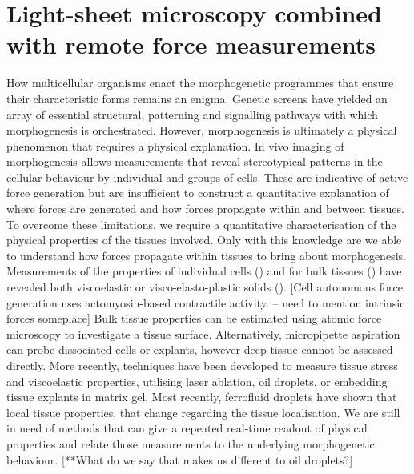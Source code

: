 \ifpdf
    \graphicspath{{Chapter3/Figs/Raster/}{Chapter3/Figs/PDF/}{Chapter3/Figs/}}
\else
    \graphicspath{{Chapter3/Figs/Vector/}{Chapter3/Figs/}}
\fi

\chapter[Light-sheet microscopy combined with remote force measurements]{Light-sheet microscopy combined with remote force measurements}%

How multicellular organisms enact the morphogenetic programmes that ensure their characteristic forms remains an enigma. Genetic screens have yielded an array of essential structural, patterning and signalling pathways with which morphogenesis is orchestrated.
However, morphogenesis is ultimately a physical phenomenon that requires a physical explanation.  In vivo imaging of morphogenesis allows measurements that reveal stereotypical patterns in the cellular behaviour by individual and groups of cells.
These are indicative of active force generation but are insufficient to construct a quantitative explanation of where forces are generated and how forces propagate within and between tissues. To overcome these limitations, we require a quantitative characterisation of the physical properties of the tissues involved.
Only with this knowledge are we able to understand how forces propagate within tissues to bring about morphogenesis. Measurements of the properties of individual cells () and for bulk tissues () have revealed both viscoelastic or visco-elasto-plastic solids ().
[Cell autonomous force generation uses actomyosin-based contractile activity. – need to mention intrinsic forces someplace]   Bulk tissue properties can be estimated using atomic force microscopy to investigate a tissue surface. Alternatively, micropipette aspiration can probe dissociated cells or explants, however deep tissue cannot be assessed directly. More recently, techniques have been developed to measure tissue stress and viscoelastic properties, utilising laser ablation,  oil droplets, or embedding tissue explants in matrix gel.
Most recently, ferrofluid droplets have shown that local tissue properties, that change regarding the tissue localisation. We are still in need of methods that can give a repeated real-time readout of physical properties and relate those measurements to the underlying morphogenetic behaviour. [**What do we say that makes us different to oil droplets?]

